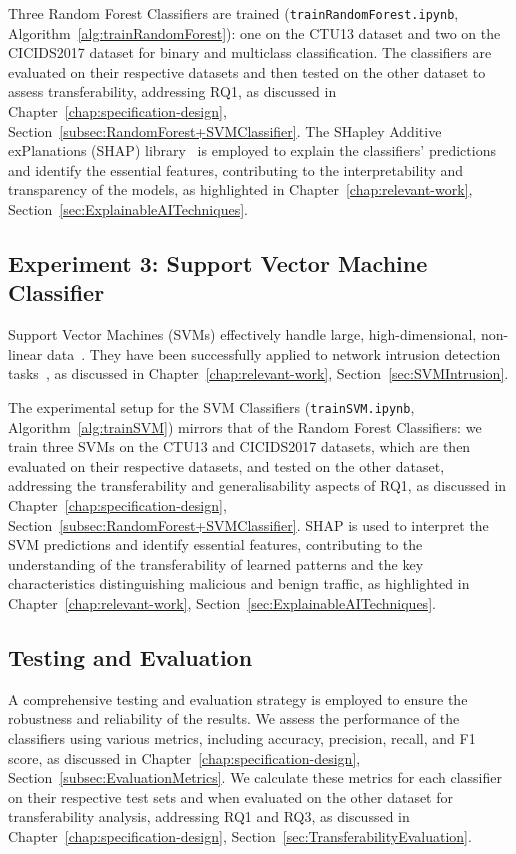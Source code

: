 Three Random Forest Classifiers are trained (\texttt{trainRandomForest.ipynb}, Algorithm~\ref{alg:trainRandomForest}): one on the CTU13 dataset and two on the CICIDS2017 dataset for binary and multiclass classification. The classifiers are evaluated on their respective datasets and then tested on the other dataset to assess transferability, addressing RQ1, as discussed in Chapter~\ref{chap:specification-design}, Section~\ref{subsec:RandomForest+SVMClassifier}. The SHapley Additive exPlanations (SHAP) library~\cite{lundberg2017unified} is employed to explain the classifiers' predictions and identify the essential features, contributing to the interpretability and transparency of the models, as highlighted in Chapter~\ref{chap:relevant-work}, Section~\ref{sec:ExplainableAITechniques}.

\subsection{Experiment 3: Support Vector Machine Classifier}\label{subsec:support-vector-machine-classifier}
Support Vector Machines (SVMs) effectively handle large, high-dimensional, non-linear data~\cite{cortes1995support, scholkopf2002learning}. They have been successfully applied to network intrusion detection tasks~\cite{kim2003network, teng2017svm}, as discussed in Chapter~\ref{chap:relevant-work}, Section~\ref{sec:SVMIntrusion}.

The experimental setup for the SVM Classifiers (\texttt{trainSVM.ipynb}, Algorithm~\ref{alg:trainSVM}) mirrors that of the Random Forest Classifiers: we train three SVMs on the CTU13 and CICIDS2017 datasets, which are then evaluated on their respective datasets, and tested on the other dataset, addressing the transferability and generalisability aspects of RQ1, as discussed in Chapter~\ref{chap:specification-design}, Section~\ref{subsec:RandomForest+SVMClassifier}. SHAP is used to interpret the SVM predictions and identify essential features, contributing to the understanding of the transferability of learned patterns and the key characteristics distinguishing malicious and benign traffic, as highlighted in Chapter~\ref{chap:relevant-work}, Section~\ref{sec:ExplainableAITechniques}.

\subsection{Testing and Evaluation}\label{subsec:testing-evaluation}
A comprehensive testing and evaluation strategy is employed to ensure the robustness and reliability of the results. We assess the performance of the classifiers using various metrics, including accuracy, precision, recall, and F1 score, as discussed in Chapter~\ref{chap:specification-design}, Section~\ref{subsec:EvaluationMetrics}. We calculate these metrics for each classifier on their respective test sets and when evaluated on the other dataset for transferability analysis, addressing RQ1 and RQ3, as discussed in Chapter~\ref{chap:specification-design}, Section~\ref{sec:TransferabilityEvaluation}.

